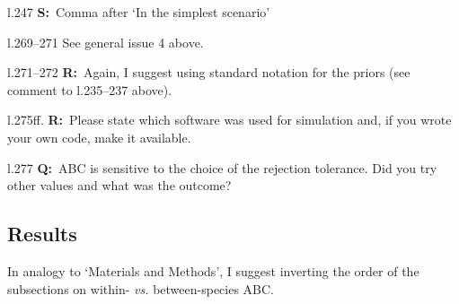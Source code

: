\documentclass[11pt]{article}
\newenvironment{my_description}
{\begin{description}
  \setlength{\itemsep}{2pt}
  \setlength{\parskip}{0pt}
  \setlength{\parsep}{0pt}}
{\end{description}}
\newcommand{\Q}{\textbf{Q:}\ }
\newcommand{\R}{\textbf{R:}\ }
\newcommand{\V}{\textbf{S:}\ }
\begin{document}
\begin{my_description}
	\item[l.247] \V Comma after `In the simplest scenario'
	\item[l.269--271] See general issue 4 above.
	\item[l.271--272] \R Again, I suggest using standard notation for the priors (see comment to l.235--237 above).
	\item[l.275ff.] \R Please state which software was used for simulation and, if you wrote your own code, make it available.
	\item[l.277] \Q ABC is sensitive to the choice of the rejection tolerance. Did you try other values and what was the outcome?
\end{my_description}


\subsection{Results}
In analogy to `Materials and Methods', I suggest inverting the order of the subsections on within- \emph{vs.} between-species ABC.
\end{document}
